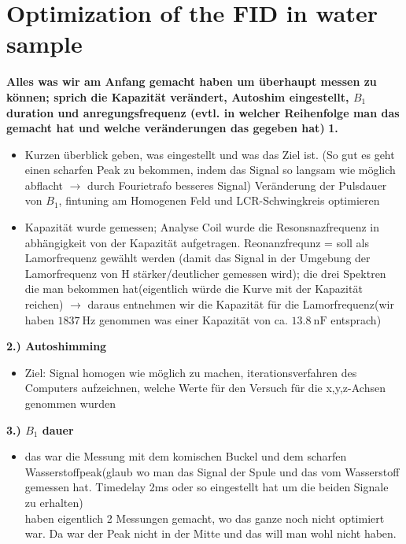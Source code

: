 \section{Optimization of the FID in water sample}
\textbf{Alles was wir am Anfang gemacht haben um überhaupt messen zu können; sprich die Kapazität verändert, Autoshim eingestellt, $B_1$ duration und anregungsfrequenz (evtl. in welcher Reihenfolge man das gemacht hat und welche veränderungen das gegeben hat)}
    \textbf{1.}
    \begin{itemize}
        \item  Kurzen überblick geben, was eingestellt und was das Ziel ist. (So gut es geht einen scharfen Peak zu bekommen, indem das Signal so langsam wie möglich abflacht $\rightarrow$ durch Fourietrafo besseres Signal) Veränderung der Pulsdauer von $B_1$, fintuning am Homogenen Feld und LCR-Schwingkreis optimieren
        \item  Kapazität wurde gemessen; Analyse Coil wurde die Resonsnazfrequenz in abhängigkeit von der Kapazität aufgetragen. Reonanzfrequnz = soll als Lamorfrequenz gewählt werden (damit das Signal in der Umgebung der Lamorfrequenz von H stärker/deutlicher gemessen wird); die drei Spektren die man bekommen hat(eigentlich würde die Kurve mit der Kapazität reichen) 
        $\rightarrow$ daraus entnehmen wir die Kapazität für die Lamorfrequenz(wir haben $\SI[]{1837}{\hertz}$ genommen was einer Kapazität von ca. $\SI[]{13,8}{\nano \farad}$ entsprach)
    \end{itemize}

    \textbf{2.) Autoshimming}
    \begin{itemize}
        \item Ziel: Signal homogen wie möglich zu machen, iterationsverfahren des Computers aufzeichnen, welche Werte für den Versuch für die x,y,z-Achsen genommen wurden
    \end{itemize}

    \textbf{3.) $B_1$ dauer}
    \begin{itemize}
        \item das war die Messung mit dem komischen Buckel und dem scharfen Wasserstoffpeak(glaub wo man das Signal der Spule und das vom Wasserstoff gemessen hat. Timedelay 2ms oder so eingestellt hat um die beiden Signale zu erhalten)\\
        haben eigentlich 2 Messungen gemacht, wo das ganze noch nicht optimiert war. Da war der Peak nicht in der Mitte und das will man wohl nicht haben.
    \end{itemize}

